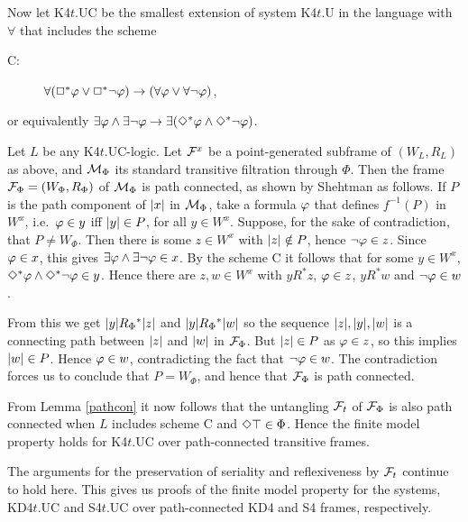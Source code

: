 Now let K4$t$.UC be the smallest extension of system  K4$t$.U in the language with $\forall$ that includes the scheme

\begin{description}
\item[C:]
$\forall(\Box^*\varphi\lor\Box^*\neg\varphi)\to(\forall\varphi\lor\forall\neg\varphi)$,
\end{description}
or equivalently
$\exists\varphi\land\exists\neg\varphi\to\exists(\Diamond^*\varphi\land\Diamond^*\neg\varphi)$.

Let $L$ be any K4$t$.UC-logic.
Let $\mathcal{F}^x$ be a point-generated subframe of $(W_L,R_L)$ as above, and $\mathcal{M}_\Phi$ its standard transitive filtration through 
$\Phi$. Then the frame $\mathcal{F}_\Phi=(W_\Phi,R_\Phi)$ of $\mathcal{M}_\Phi$ is path connected, as shown by 
Shehtman \cite{Sheh:everywhere99} as follows. If $P$ is the path component of $|x|$ in $\mathcal{M}_\Phi$, take a formula $\varphi$ that defines $f^{-1}(P)$ in $W^x$, i.e.\ $\varphi\in y$ iff $|y|\in P$, for all 
$y\in W^x$. Suppose, for the sake of contradiction, that $P\ne W_\Phi$. Then there is some $z\in W^x$ with $|z|\notin P$, hence $\neg\varphi\in z$. Since $\varphi\in x$, this gives  $\exists\varphi\land\exists\neg\varphi\in x$. By the scheme C it follows that for some $y\in W^x$, 
$\Diamond^*\varphi\land\Diamond^*\neg\varphi\in y$. Hence there are $z,w\in W^x$ with $yR^*z$, $\varphi\in z$, $yR^* w$ and $\neg\varphi\in w$.

From this we get $|y|R_\Phi{}^*|z|$ and $|y|R_\Phi{}^*|w|$ so the sequence $|z|,|y|,|w|$ is a connecting path between  $|z|$ and  $|w|$ in $\mathcal{F}_\Phi$. But $|z|\in P$ as $\varphi\in z$, so this implies $|w|\in P$. Hence $\varphi\in w$, contradicting the fact that $\neg\varphi\in w$. The contradiction forces us to conclude that $P= W_\Phi$, and hence that $\mathcal{F}_\Phi$ is path connected.

From Lemma \ref{pathcon} it now follows that the untangling $\mathcal{F}_t$ of $\mathcal{F}_\Phi$ is also path connected when $L$  includes scheme C and $\Diamond\top\in\Phi$. Hence the finite model property holds for K4$t$.UC over path-connected transitive frames.

The arguments for the preservation of seriality and reflexiveness by $\mathcal{F}_t$ continue to hold here. This gives us proofs of the
finite model property  for the systems, KD4$t$.UC and S4$t$.UC over path-connected KD4 and S4 frames, respectively.

